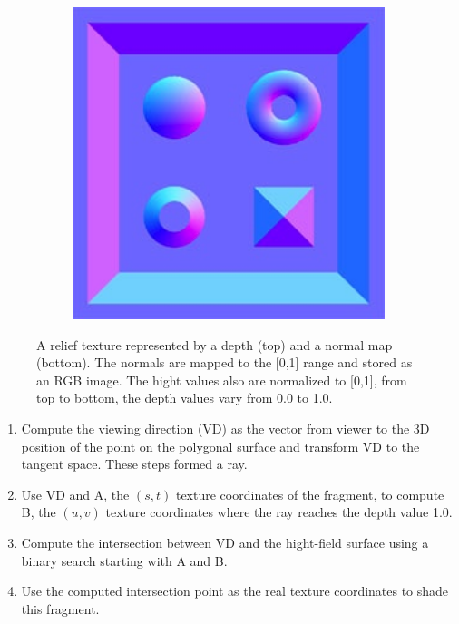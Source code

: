 \begin{figure}
\begin{center}
\begin{subfigure}[c]{.48\textwidth}
		\includegraphics[width=1.0\textwidth]{graphics/df/relief-mapping-representation2}
	\end{subfigure}
\end{center}
	\caption{A relief texture represented by a depth (top) and a normal map (bottom). The normals are mapped to the [0,1] range and stored as an RGB image. The hight values also are normalized to [0,1], from top to bottom, the depth values vary from 0.0 to 1.0.}
	\label{relief-mapping-representation}
\end{figure}

\begin{enumerate}
	\item Compute the viewing direction (VD) as the vector from viewer to the 3D position of the point on the polygonal surface and transform VD to the tangent space. These steps formed a ray.
	\item Use VD and A, the $(s,t)$ texture coordinates of the fragment, to compute B, the $(u,v)$ texture coordinates where the ray reaches the depth value 1.0.
	\item Compute the intersection between VD and the hight-field surface using a binary search starting with A and B.
	\item Use the computed intersection point as the real texture coordinates to shade this fragment.
\end{enumerate}

